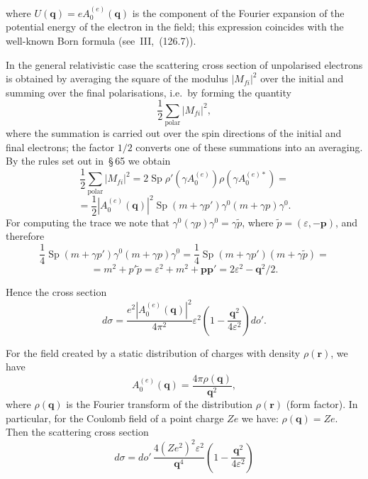 where $U(\mathbf{q}) = eA_0^{(e)}(\mathbf{q})$ is the component of the Fourier expansion of the potential energy of the electron in the field; this expression coincides with the well-known Born formula (see~III,~(126.7)).

In the general relativistic case the scattering cross section of unpolarised electrons is obtained by averaging the square of the modulus $|M_{fi}|^2$ over the initial and summing over the final polarisations, i.e.\ by forming the quantity
\[
\frac{1}{2}\sum_{\text{polar}}|M_{fi}|^2,
\]
where the summation is carried out over the spin directions of the initial and final electrons; the factor $1/2$ converts one of these summations into an averaging. By the rules set out in~\S\,65 we obtain
\[
\frac{1}{2}\sum_{\text{polar}}|M_{fi}|^2 = 2\operatorname{Sp}\rho'(\gamma A_0^{(e)}) \rho (\gamma A_0^{(e)*}) =
\]
\[
= \frac{1}{2}|A_0^{(e)}(\mathbf{q})|^2\operatorname{Sp}(m + \gamma p')\gamma^0(m + \gamma p)\gamma^0.
\]
For computing the trace we note that $\gamma^0(\gamma p)\gamma^0 = \gamma\widetilde{p}$, where $\widetilde{p} = (\varepsilon, -\mathbf{p})$, and therefore
\[
\frac{1}{4}\operatorname{Sp}(m + \gamma p')\gamma^0(m + \gamma p)\gamma^0 = \frac{1}{4}\operatorname{Sp}(m + \gamma p')(m + \gamma\widetilde{p}) =
\]
\[
= m^2 + p'\widetilde{p} = \varepsilon^2 + m^2 + \mathbf{p}\mathbf{p}' = 2\varepsilon^2 - \mathbf{q}^2/2.
\]

Hence the cross section
\begin{equation}
d\sigma = \frac{e^2|A_0^{(e)}(\mathbf{q})|^2}{4\pi^2}\varepsilon^2\left(1 - \frac{\mathbf{q}^2}{4\varepsilon^2}\right)do'.
\tag{80.5}
\end{equation}

For the field created by a static distribution of charges with density $\rho(\mathbf{r})$, we have
\begin{equation}
A_0^{(e)}(\mathbf{q}) = \frac{4\pi\rho(\mathbf{q})}{\mathbf{q}^2},
\tag{80.6}
\end{equation}
where $\rho(\mathbf{q})$ is the Fourier transform of the distribution $\rho(\mathbf{r})$ (form factor). In particular, for the Coulomb field of a point charge $Ze$ we have: $\rho(\mathbf{q}) = Ze$. Then the scattering cross section
\begin{equation}
d\sigma = do'\,\frac{4(Ze^2)^2\varepsilon^2}{\mathbf{q}^4}\left(1 - \frac{\mathbf{q}^2}{4\varepsilon^2}\right)
\tag{80.7}
\end{equation}

